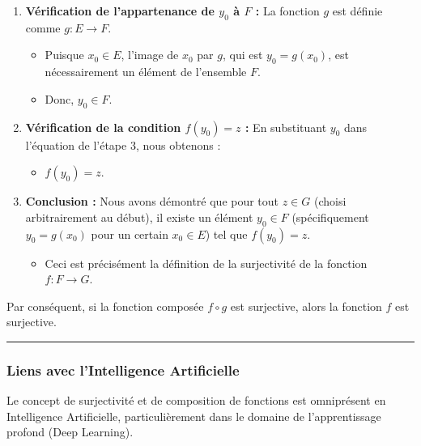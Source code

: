 \documentclass[12pt,a4paper]{report}
\providecommand{\tightlist}{%
  \setlength{\itemsep}{0pt}\setlength{\parskip}{0pt}}
\begin{document}
\begin{enumerate}
  \begin{itemize}
  \tightlist
  \item
    Posons \(y_0 = g(x_0)\).
  \end{itemize}
\item
  \textbf{Vérification de l'appartenance de \(y_0\) à \(F\) :} La
  fonction \(g\) est définie comme \(g: E \to F\).

  \begin{itemize}
  \tightlist
  \item
    Puisque \(x_0 \in E\), l'image de \(x_0\) par \(g\), qui est
    \(y_0 = g(x_0)\), est nécessairement un élément de l'ensemble \(F\).
  \item
    Donc, \(y_0 \in F\).
  \end{itemize}
\item
  \textbf{Vérification de la condition \(f(y_0) = z\) :} En substituant
  \(y_0\) dans l'équation de l'étape 3, nous obtenons :

  \begin{itemize}
  \tightlist
  \item
    \(f(y_0) = z\).
  \end{itemize}
\item
  \textbf{Conclusion :} Nous avons démontré que pour tout \(z \in G\)
  (choisi arbitrairement au début), il existe un élément \(y_0 \in F\)
  (spécifiquement \(y_0 = g(x_0)\) pour un certain \(x_0 \in E\)) tel
  que \(f(y_0) = z\).

  \begin{itemize}
  \tightlist
  \item
    Ceci est précisément la définition de la surjectivité de la fonction
    \(f: F \to G\).
  \end{itemize}
\end{enumerate}

Par conséquent, si la fonction composée \(f \circ g\) est surjective,
alors la fonction \(f\) est surjective.

\begin{center}\rule{0.5\linewidth}{0.5pt}\end{center}

\subsubsection{Liens avec l'Intelligence
Artificielle}\label{liens-avec-lintelligence-artificielle}

Le concept de surjectivité et de composition de fonctions est
omniprésent en Intelligence Artificielle, particulièrement dans le
domaine de l'apprentissage profond (Deep Learning).
\end{document}
